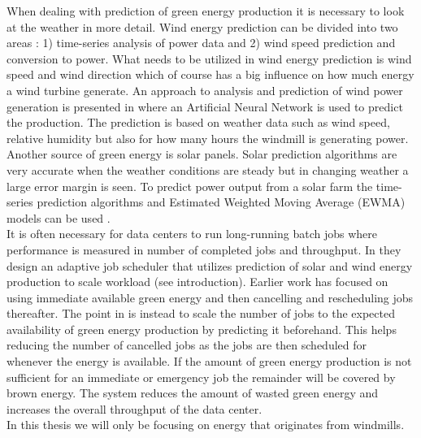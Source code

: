 When dealing with prediction of green energy production it is necessary to look at the weather in more detail. Wind energy prediction can be divided into two areas \cite{5}: 1) time-series analysis of power data and 2) wind speed prediction and conversion to power. What needs to be utilized in wind energy prediction is wind speed and wind direction which of course has a big influence on how much energy a wind turbine generate. An approach to analysis and prediction of wind power generation is presented in \cite{WindPowerGenerationUsingANN} where an Artificial Neural Network is used to predict the production. The prediction is based on weather data such as wind speed, relative humidity but also for how many hours the windmill is generating power. 
\\[0.5cm]
Another source of green energy is solar panels. Solar
prediction algorithms are very accurate when the weather conditions are steady but in changing weather a large error margin is seen. To predict power output from a solar farm the time-series prediction algorithms and Estimated Weighted Moving Average (EWMA) models can be used \cite{5}.
\\[0.5cm]
It is often necessary for data centers to run long-running batch jobs where performance is measured in number of completed jobs and throughput. In \cite{5} they design an adaptive job scheduler that utilizes prediction of solar and wind energy production to scale workload (see introduction). Earlier work has focused on using immediate available green energy and then cancelling and rescheduling jobs thereafter. The point in \cite{5} is instead to scale the number of jobs to the expected availability of green energy production by predicting it beforehand. This helps reducing the number of cancelled jobs as the jobs are then scheduled for whenever the energy is available. If the amount of green energy production is not sufficient for an immediate or emergency job the remainder will be covered by brown energy. The system reduces the amount of wasted green energy and increases the overall throughput of the data center.
\\[0.5cm]
In this thesis we will only be focusing on energy that originates from windmills.